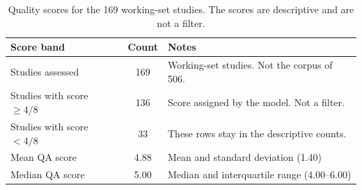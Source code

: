 \begin{table}[htbp]
\centering
\caption{Quality scores for the 169 working-set studies. The scores are descriptive and are not a filter.}
\label{tab:qa-results}
\begin{tabular}{lcp{6.5cm}}
\toprule
\textbf{Score band} & \textbf{Count} & \textbf{Notes} \\
\midrule
Studies assessed & 169 & Working-set studies. Not the corpus of 506. \\
Studies with score $\geq 4/8$ & 136 & Score assigned by the model. Not a filter. \\
Studies with score $< 4/8$ & 33 & These rows stay in the descriptive counts. \\
Mean QA score & 4.88 & Mean and standard deviation (1.40) \\
Median QA score & 5.00 & Median and interquartile range (4.00--6.00) \\
\bottomrule
\end{tabular}
\end{table}
